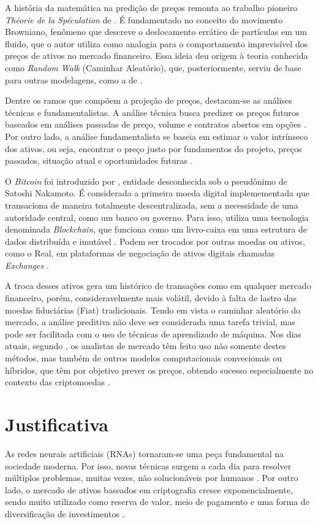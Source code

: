 A história da matemática na predição de preços remonta ao trabalho pioneiro \textit{Théorie de la Spéculation} de \textcite{Bachelier} \cite{Fama1965,Fama,Courtault}. É fundamentado no conceito do movimento Browniano, 
fenômeno que descreve o deslocamento errático de partículas em um fluido, que o autor utiliza como analogia para o comportamento imprevisível dos preços de ativos no mercado financeiro. 
Essa ideia deu origem à teoria conhecida como \textit{Random Walk} (Caminhar Aleatório), que, posteriormente, serviu de base para outras modelagens, como a de \textcite{blacksholes}.

Dentre os ramos que compõem a projeção de preços, destacam-se as análises técnicas e fundamentalistas.
A análise técnica busca predizer os preços futuros baseados em análises passadas de preço, volume e contratos abertos em opções \cite{Pring}.
Por outro lado, a análise fundamentalista se baseia em estimar o valor intrínseco dos ativos, ou seja, encontrar o preço justo por fundamentos do projeto, preços passados, situação atual e oportunidades futuras \cite{Ahmed}.

O \textit{Bitcoin} foi introduzido por \textcite{Nakamoto}, entidade desconhecida sob o pseudônimo de Satoshi Nakamoto. 
É considerada a primeira moeda digital implemementada que transaciona de maneira totalmente descentralizada, sem a necessidade de uma autoridade central, como um banco ou governo. 
Para isso, utiliza uma tecnologia denominada \textit{Blockchain}, que funciona como um livro-caixa em uma estrutura de dados distribuída e imutável \cite{Ledger}. Podem ser trocados por outras moedas ou ativos, como o Real, em plataformas de negociação de ativos digitais chamadas \textit{Exchanges} \cite{FakeExchanges}.

A troca desses ativos gera um histórico de transações como em qualquer mercado financeiro,
porém, consideravelmente mais volátil, devido à falta de lastro das moedas fiduciárias (Fiat) tradicionais. 
Tendo em vista o caminhar aleatório do mercado, a análise preditiva não deve ser considerada uma tarefa trivial, mas pode ser facilitada com o uso de técnicas de aprendizado de máquina.
Nos dias atuais, segundo \textcite{Fang}, os analistas de mercado têm feito uso não somente destes métodos, mas também de outros modelos computacionais convecionais ou híbridos, que têm por objetivo prever os preços, obtendo sucesso especialmente no contexto das criptomoedas \cite{Atsalakis}.

\section{Justificativa}
As redes neurais artificiais (RNAs) tornaram-se uma peça fundamental na sociedade moderna. Por isso, novas técnicas surgem a cada dia para resolver múltiplos problemas, 
muitas vezes, não solucionáveis por humanos \cite{Good}.
Por outro lado, o mercado de ativos baseados em criptografia cresce exponencialmente, 
sendo muito utilizado como reserva de valor, meio de pagamento e uma forma de diversificação de investimentos \cite{Sousa}.

